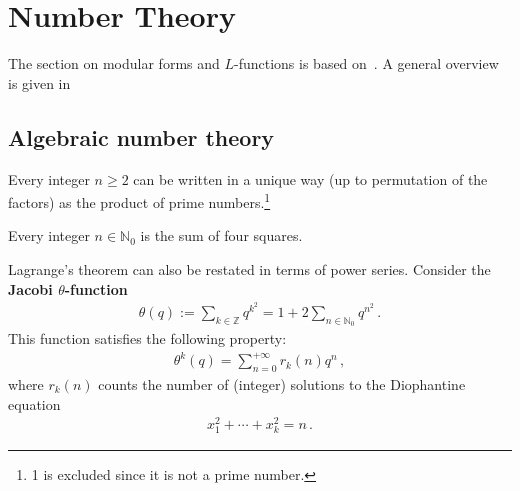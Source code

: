 \chapter{Number Theory}

    The section on modular forms and $L$-functions is based on~\cite{sutherland_modular_2017,mustata_zeta_2011}. A general overview is given in~\cite{waldschmidt_number_1992}

    \minitoc

\section{Algebraic number theory}


    \begin{theorem}\label{number:prime_factorization}
        Every integer $n\geq2$ can be written in a unique way (up to permutation of the factors) as the product of prime numbers.\footnote{1 is excluded since it is not a prime number.}
    \end{theorem}

    \begin{theorem}[Lagrange]
        Every integer $n\in\mathbb{N}_0$ is the sum of four squares.
    \end{theorem}

    Lagrange's theorem can also be restated in terms of power series. Consider the \textbf{Jacobi $\theta$-function}
    \begin{gather}
        \label{number:jacobi_series}
        \theta(q) := \sum_{k\in\mathbb{Z}}q^{k^2} = 1 + 2\sum_{n\in\mathbb{N}_0}q^{n^2}\,.
    \end{gather}
    This function satisfies the following property:
    \begin{gather}
        \label{number:theta_function}
        \theta^k(q) = \sum_{n=0}^{+\infty}r_k(n)q^n\,,
    \end{gather}
    where $r_k(n)$ counts the number of (integer) solutions to the Diophantine equation
    \begin{gather}
        x_1^2+\cdots+x_k^2=n\,.
    \end{gather}

